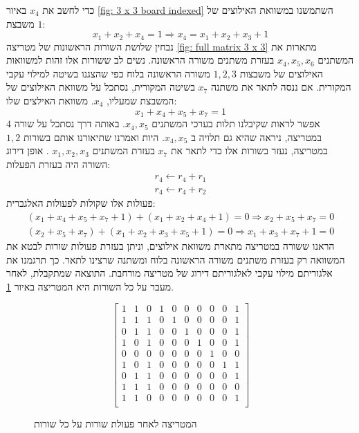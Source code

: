 \documentclass[12pt,leqno]{article}
\theoremstyle{theoremdd}
\begin{document}
כדי לחשב את 
$x_4$
באיור
\ref{fig: 3 x 3 board indexed}
השתמשנו במשוואת האילוצים של 
משבצת 
$1$:
\[
    x_1 + x_2 + x_4 = 1 \Rightarrow x_4 = x_1 + x_2 + x_3 + 1
\]
נבחין שלושת השורות הראשונות  
של מטריצה 
\ref{fig: full matrix 3 x 3}
מתארות את המשתנים 
$x_4, x_5, x_6$
בעזרת משתנים 
משורה הראשונה.
נשים לב ששורות אלו זהות למשוואות האילוצים של משבצות
$1,2,3$
משורה הראשונה
בלוח כפי שהצגנו בשיטה למילוי עקבי המקורית.
אם ננסה לתאר 
את משתנה 
$x_7$
בשיטה המקורית, נסתכל על משוואת האילוצים של המשבצת שמעליו,
$x_4$.
משוואת האילצים שלו:
\[ x_1 + x_4 + x_5 + x_7 = 1 \]
אפשר לראות שקיבלנו תלות בערכי המשתנים 
$x_4, x_5$.
באותה דרך 
נסתכל על שורה 
$4$
במטריצה,
ניראה שהיא גם תלויה ב
$x_4, x_5$.
היות 
ואמרנו שתיאורנו אותם בשורות 
$1, 2$
במטריצה,
נעזר בשורות אלו כדי לתאר את 
$x_7$
בעזרת המשתנים 
$x_1, x_2, x_3$
.
אופן דירוג השורה היה בעזרת
הפעלות:
\begin{align*}
    r_4 \leftarrow r_4 + r_1
    \\
    r_4 \leftarrow r_4 + r_2
\end{align*}
פעולות אלו שקולות לפעולות האלגברית:
\begin{align*}
   (x_1 + x_4 + x_5 + x_7 + 1) + (x_1 + x_2 + x_4 + 1) = 0 \Rightarrow x_2 + x_5 + x_7 = 0
    \\
    (x_2 + x_5 + x_7) + (x_1 + x_2 + x_3 + x_5 + 1 ) = 0 \Rightarrow x_1 + x_3 + x_7 + 1 = 0
\end{align*}
הראנו ששורה במטריצה מתארת משוואת אילוצים,
וניתן בעזרת פעולות שורות לבטא את המשוואה
רק בעזרת משתנים משורה הראשונה בלוח ומשתנה שרצינו לתאר.
כך תרגמנו את אלגוריתם מילוי עקבי לאלגוריתם דירוג של מטריצה מורחבת.
התוצאה שמתקבלת, לאחר מעבר על כל השורות היא המטריצה 
באיור
\ref{fig: matrix after spanish}.

\begin{figure}[ht]
    \caption{המטריצה לאחר פעולת שורות על כל שורות}
    \label{fig: matrix after spanish}
    \begin{english}
        \begin{center}
            \[
                \left[
                \begin{array}{ccccccccc|c}
                1& 1& 0& 1& 0& 0& 0& 0& 0& 1 \\
                1& 1& 1& 0& 1& 0& 0& 0& 0& 1 \\
                0& 1& 1& 0& 0& 1& 0& 0& 0& 1 \\
                1& 0& 1& 0& 0& 0& 1& 0& 0& 1\\
                0& 0& 0& 0& 0& 0& 0& 1& 0& 0\\
                1& 0& 1& 0& 0& 0& 0& 0& 1& 1\\
                0& 1& 1& 0& 0& 0& 0& 0& 0& 1\\
                1& 1& 1& 0& 0& 0& 0& 0& 0& 0\\
                1& 1& 0& 0& 0& 0& 0& 0& 0& 1\\
            \end{array}
            \right]
            \]
        \end{center}       
    \end{english}
\end{figure}
\end{document}
